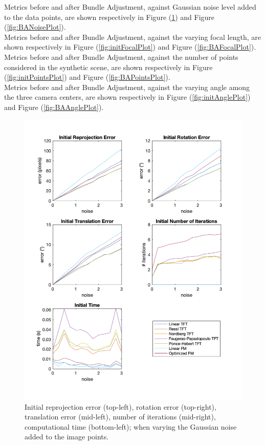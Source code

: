 Metrics before and after Bundle Adjustment, against Gaussian noise level added to the data points, are shown respectively in Figure (\ref{fig:initNoisePlot}) and Figure (\ref{fig:BANoisePlot}).\\

Metrics before and after Bundle Adjustment, against the varying focal length, are shown respectively in Figure (\ref{fig:initFocalPlot}) and Figure (\ref{fig:BAFocalPlot}).\\

Metrics before and after Bundle Adjustment, against the number of points considered in the synthetic scene, are shown respectively in Figure (\ref{fig:initPointsPlot}) and Figure (\ref{fig:BAPointsPlot}).\\

Metrics before and after Bundle Adjustment, against the varying angle among the three camera centers, are shown respectively in Figure (\ref{fig:initAnglePlot}) and Figure (\ref{fig:BAAnglePlot}).

\begin{figure}[p]
	\centering
	\includegraphics[width=1\textwidth]{Experiments/Synthetic/noise/INITnoisePlots.png}
	\caption{Initial reprojection error (top-left), rotation error (top-right), translation error (mid-left), number of iterations (mid-right), computational time (bottom-left); when varying the Gaussian noise added to the image points.}
	\label{fig:initNoisePlot}
\end{figure}


